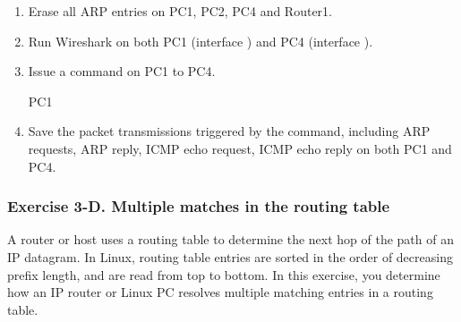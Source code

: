 
\begin{enumerate}
	\item Erase all ARP entries on PC1, PC2, PC4 and Router1.
	\item Run Wireshark on both PC1 (interface ) and PC4 (interface ).
	\item Issue a  command on PC1 to PC4.
		\begin{cmdblock}
	PC1%
		\end{cmdblock}
	\item Save the packet transmissions triggered by the  command, including ARP requests, ARP reply, ICMP echo request, ICMP echo reply on both PC1 and PC4.
\end{enumerate}

\begin{questions}
\end{questions}
	
\subsubsection*{Exercise 3-D. Multiple matches in the routing table}

A router or host uses a routing table to determine the next hop of the path of an IP datagram. In Linux, routing table entries are sorted in the order of decreasing prefix length, and are read from top to bottom. In this exercise, you determine how an IP router or Linux PC resolves multiple matching entries in a routing table.

